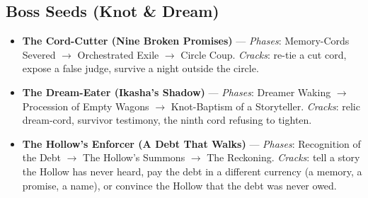 \subsection*{Boss Seeds (Knot \& Dream)}
\begin{itemize}
\item \textbf{The Cord-Cutter (Nine Broken Promises)} --- \emph{Phases}: Memory-Cords Severed $\rightarrow$ Orchestrated Exile $\rightarrow$ Circle Coup. \emph{Cracks}: re-tie a cut cord, expose a false judge, survive a night outside the circle.
\item \textbf{The Dream-Eater (Ikasha's Shadow)} --- \emph{Phases}: Dreamer Waking $\rightarrow$ Procession of Empty Wagons $\rightarrow$ Knot-Baptism of a Storyteller. \emph{Cracks}: relic dream-cord, survivor testimony, the ninth cord refusing to tighten.
\item \textbf{The Hollow's Enforcer (A Debt That Walks)} --- \emph{Phases}: Recognition of the Debt $\rightarrow$ The Hollow's Summons $\rightarrow$ The Reckoning. \emph{Cracks}: tell a story the Hollow has never heard, pay the debt in a different currency (a memory, a promise, a name), or convince the Hollow that the debt was never owed.
\end{itemize}

